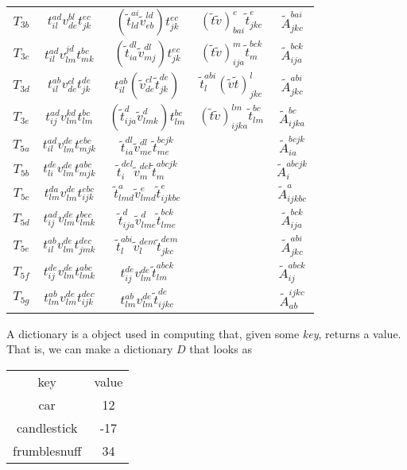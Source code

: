 \begin{table}[h]
\begin{tabular}{ccccc}
			$T_{3b}$ & $t_{il}^{ad}v_{de}^{bl}t_{jk}^{ec}$ & $\left(\tilde{t}_{ld}^{ai}\tilde{v}_{eb}^{ld}\right)t_{jk}^{ec}$ & $(\tilde{t}\tilde{v})_{bai}^{e}\tilde{t}_{jkc}^{e}$ & $\tilde{A}_{jkc}^{bai}$ \\
			$T_{3c}$ & $t_{il}^{ad}v_{lm}^{jd}t_{mk}^{bc}$ & $\left(\tilde{t}_{ia}^{dl}\tilde{v}_{mj}^{dl}\right)t_{jk}^{ec}$ & $(\tilde{t}\tilde{v})_{ija}^{m}\tilde{t}_{m}^{bck}$ & $\tilde{A}_{ija}^{bck}$ \\
			$T_{3d}$ & $t_{il}^{ab}v_{de}^{cl}t_{jk}^{de}$ & $t_{il}^{ab}\left(\tilde{v}_{de}^{cl}\tilde{t}_{jk}^{de}\right)$ & $\tilde{t}_{l}^{abi}(\tilde{v}\tilde{t})_{jkc}^{l}$ & $\tilde{A}_{jkc}^{abi}$ \\
			$T_{3e}$ & $t_{ij}^{ad}v_{lm}^{kd}t_{lm}^{bc}$ & $\left(\tilde{t}_{ija}^{d}\tilde{v}_{lmk}^{d}\right)t_{lm}^{bc}$ & $(\tilde{t}\tilde{v})_{ijka}^{lm}\tilde{t}_{lm}^{bc}$ & $\tilde{A}_{ijka}^{bc}$ \\
			$T_{5a}$ & $t_{il}^{ad}v_{lm}^{de}t_{mjk}^{ebc}$ & $\tilde{t}_{ia}^{dl}\tilde{v}_{me}^{dl}\tilde{t}_{me}^{bcjk}$ & & $\tilde{A}_{ia}^{bcjk}$ \\
			$T_{5b}$ & $t_{li}^{de}v_{lm}^{de}t_{mjk}^{abc}$ & $\tilde{t}_{i}^{del}\tilde{v}_{m}^{del}\tilde{t}_{m}^{abcjk}$ & & $\tilde{A}_{i}^{abcjk}$ \\
			$T_{5c}$ & $t_{lm}^{da}v_{lm}^{de}t_{ijk}^{ebc}$ & $\tilde{t}_{lmd}^{a}\tilde{v}_{lmd}^{e}\tilde{t}_{ijkbc}^{e}$ & & $\tilde{A}_{ijkbc}^{a}$ \\
			$T_{5d}$ & $t_{ij}^{ad}v_{lm}^{de}t_{lmk}^{bec}$ & $\tilde{t}_{ija}^{d}\tilde{v}_{lme}^{d}\tilde{t}_{lme}^{bck}$ & & $\tilde{A}_{ija}^{bck}$ \\
			$T_{5e}$ & $t_{il}^{ab}v_{lm}^{de}t_{jmk}^{dec}$ & $\tilde{t}_{l}^{abi}\tilde{v}_{l}^{dem}\tilde{t}_{jkc}^{dem}$ & & $\tilde{A}_{jkc}^{abi}$ \\
			$T_{5f}$ & $t_{ij}^{de}v_{lm}^{de}t_{lmk}^{abc}$ & $t_{ij}^{de}v_{lm}^{de}\tilde{t}_{lm}^{abck}$ & & $\tilde{A}_{ij}^{abck}$ \\
			$T_{5g}$ & $t_{lm}^{ab}v_{lm}^{de}t_{ijk}^{dec}$ & $t_{lm}^{ab}v_{lm}^{de}\tilde{t}_{ijkc}^{de}$ & & $\tilde{A}_{ab}^{ijkc}$
		\end{tabular}
		\label{Implementation | table | "alignments"}
	\end{table}
	
	A dictionary is a object used in computing that, given some \emph{key}, returns a value. That is, we can make a dictionary $D$ that looks as
	
	\begin{center}
	\begin{tabular}{cc}
		key & value \\
		car & 12 \\
		candlestick & -17 \\
		frumblesnuff & 34
	\end{tabular}
	\end{center}
	
